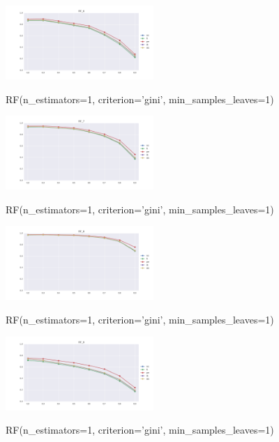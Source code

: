 \documentclass{sig-alternate-05-2015}
\begin{document}
\begin{figure}[]
  \centering
  \caption{RF(n\_estimators=1, criterion='gini', min\_samples\_leaves=1)}
  \includegraphics[width=0.5\textwidth]{../plots/RF_6}
  \label{fig:anomalySetup}
\end{figure}

\begin{figure}[]
  \centering
  \caption{RF(n\_estimators=1, criterion='gini', min\_samples\_leaves=1)}
  \includegraphics[width=0.5\textwidth]{../plots/RF_7}
  \label{fig:anomalySetup}
\end{figure}

\begin{figure}[]
  \centering
  \caption{RF(n\_estimators=1, criterion='gini', min\_samples\_leaves=1)}
  \includegraphics[width=0.5\textwidth]{../plots/RF_8}
  \label{fig:anomalySetup}
\end{figure}

\begin{figure}[]
  \centering
  \caption{RF(n\_estimators=1, criterion='gini', min\_samples\_leaves=1)}
  \includegraphics[width=0.5\textwidth]{../plots/RF_9}
  \label{fig:anomalySetup}
\end{figure}
\end{document}

